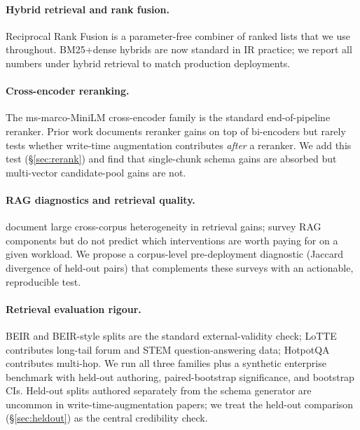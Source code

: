 \documentclass[11pt]{article}
\begin{document}
\paragraph{Hybrid retrieval and rank fusion.} Reciprocal Rank Fusion
\citep{cormack2009rrf} is a parameter-free combiner of ranked lists
that we use throughout. BM25+dense hybrids are now standard in IR
practice; we report all numbers under hybrid retrieval to match
production deployments.

\paragraph{Cross-encoder reranking.} The
ms-marco-MiniLM cross-encoder family
\citep{nogueira2019passage,reimers2019sentencebert} is the standard
end-of-pipeline reranker. Prior work documents reranker gains on top
of bi-encoders \citep{nogueira2019passage} but rarely tests whether
write-time augmentation contributes \emph{after} a reranker. We add
this test (\S\ref{sec:rerank}) and find that single-chunk schema
gains are absorbed but multi-vector candidate-pool gains are not.

\paragraph{RAG diagnostics and retrieval quality.}
\citet{thakur2021beir} document large cross-corpus heterogeneity in
retrieval gains; \citet{gao2023ragsurvey} survey RAG components but do not
predict which interventions are worth paying for on a given workload.
We propose a corpus-level pre-deployment diagnostic (Jaccard
divergence of held-out pairs) that complements these surveys with an
actionable, reproducible test.

\paragraph{Retrieval evaluation rigour.} BEIR
\citep{thakur2021beir} and BEIR-style splits are the standard
external-validity check; LoTTE \citep{santhanam2022colbertv2}
contributes long-tail forum and STEM question-answering data; HotpotQA
\citep{yang2018hotpot} contributes multi-hop. We run all three
families plus a synthetic enterprise benchmark with held-out
authoring, paired-bootstrap significance, and bootstrap CIs. Held-out
splits authored separately from the schema generator are uncommon in
write-time-augmentation papers; we treat the held-out comparison
(\S\ref{sec:heldout}) as the central credibility check.
\end{document}
